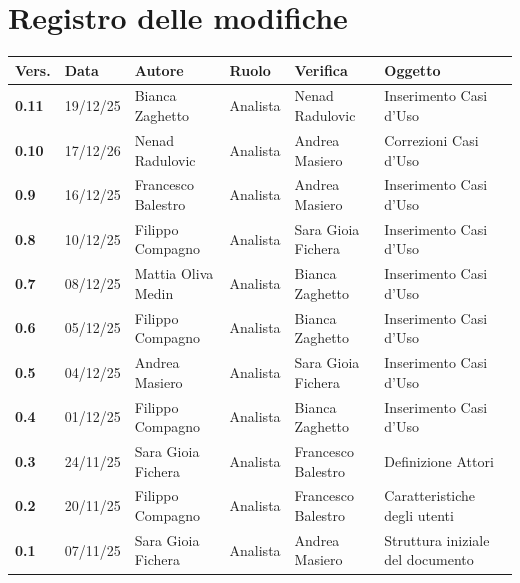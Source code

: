 \documentclass[a4paper,12pt]{article}
\begin{document}
    

    \section*{Registro delle modifiche} {
        \begin{table}[h!]
                \begin{tabularx}{\textwidth}{|l|l|l|l|L|L|}
                \hline
                \textbf{Vers.} & \textbf{Data} & \textbf{Autore} & \textbf{Ruolo} & \textbf{Verifica} & \textbf{Oggetto} \\
                \hline
                \textbf{0.11} & 19/12/25 & Bianca Zaghetto & Analista & Nenad Radulovic & Inserimento Casi d'Uso \\
                \hline
                \textbf{0.10} & 17/12/26 & Nenad Radulovic & Analista & Andrea Masiero & Correzioni Casi d'Uso \\
                \hline
                \textbf{0.9} & 16/12/25 & Francesco Balestro & Analista & Andrea Masiero & Inserimento Casi d'Uso \\
                \hline
                \textbf{0.8} & 10/12/25 & Filippo Compagno & Analista & Sara Gioia Fichera & Inserimento Casi d'Uso \\
                \hline
                \textbf{0.7} & 08/12/25 & Mattia Oliva Medin & Analista & Bianca Zaghetto & Inserimento Casi d'Uso \\
                \hline
                \textbf{0.6} & 05/12/25 & Filippo Compagno & Analista & Bianca Zaghetto & Inserimento Casi d'Uso \\
                \hline
                \textbf{0.5} & 04/12/25 & Andrea Masiero & Analista & Sara Gioia Fichera & Inserimento Casi d'Uso \\
                \hline
                \textbf{0.4} & 01/12/25 & Filippo Compagno & Analista & Bianca Zaghetto & Inserimento Casi d'Uso \\
                \hline
                \textbf{0.3} & 24/11/25 & Sara Gioia Fichera & Analista & Francesco Balestro &  Definizione Attori \\
                \hline
                \textbf{0.2} & 20/11/25 & Filippo Compagno & Analista & Francesco Balestro & Caratteristiche degli utenti \\
                \hline
                \textbf{0.1} & 07/11/25 & Sara Gioia Fichera & Analista & Andrea Masiero & Struttura iniziale del documento \\
                \hline
            \end{tabularx}
        \end{table}
    }
    \newpage
    
\end{document}
